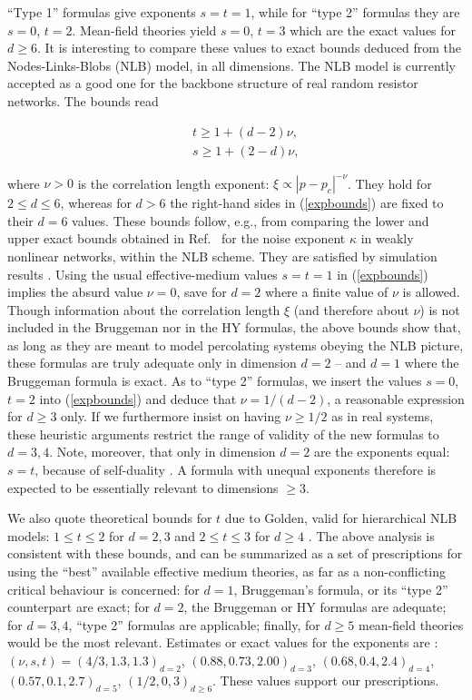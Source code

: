 ``Type 1'' formulas give exponents $s=t=1$, while for ``type 2''
formulas they are $s=0$, $t=2$. Mean-field theories yield $s=0$, $t=3$
which are the exact values for $d\geq 6$.  It is interesting to
compare these values to exact bounds deduced from the
Nodes-Links-Blobs (NLB) model, in all dimensions. The NLB model is
currently accepted as a good one for the backbone structure of real
random resistor networks\cite{STAU92}. The bounds read
\begin{mathletters}
\label{expbounds}
\begin{eqnarray}
&&t\ge 1+(d-2)\nu,\\
&&s\ge 1+(2-d)\nu,
\end{eqnarray}
\end{mathletters}
where $\nu>0$ is the correlation length exponent: $\xi\propto
|p-p_c|^{-\nu}$. They hold for $2\leq d\leq 6$, whereas for $d>6$ the
right-hand sides in (\ref{expbounds}) are fixed to their $d=6$
values. These bounds follow, e.g., from comparing the lower and upper
exact bounds obtained in Ref.\ \cite{WRIG86} for the noise exponent
$\kappa$ in weakly nonlinear networks, within the NLB scheme. They
are satisfied by simulation results \cite{WRIG86}. 
Using the usual
effective-medium values $s=t=1$ in (\ref{expbounds}) implies the
absurd value $\nu=0$, save for $d=2$ where a finite value of $\nu$ is
allowed. Though information about the correlation length $\xi$ (and
therefore about $\nu$) is not included in the Bruggeman nor in the HY
formulas, the above bounds show that, as long as they are meant to
model percolating systems obeying the NLB picture, these formulas are
truly adequate only in dimension $d=2$ -- and $d=1$ where the Bruggeman
formula is exact. As to ``type 2'' formulas, we insert the
values $s=0$, $t=2$ into (\ref{expbounds}) and deduce that
$\nu=1/(d-2)$, a reasonable expression for $d\geq 3$ only. If we
furthermore insist on having $\nu\geq 1/2$ as in real systems, these
heuristic arguments restrict the range of validity of the new formulas
to $d=3,4$. Note, moreover, that only in dimension $d=2$ are the
exponents equal: $s=t$, because of self-duality \cite{STRA77}.  A
formula with unequal exponents therefore is expected to be essentially
relevant to dimensions $\geq 3$.

We also quote theoretical bounds for $t$ due to Golden, valid for
hierarchical NLB models: $1\leq t\leq 2$ for $d=2,3$ and $2\leq t\leq
3$ for $d\geq 4$ \cite{GOLD90}. The above analysis is consistent with
these bounds, and can be summarized as a set of prescriptions for
using the ``best'' available effective medium theories, as far as a
non-conflicting critical behaviour is concerned: for $d=1$,
Bruggeman's formula, or its ``type 2'' counterpart are exact; for
$d=2$, the Bruggeman or HY formulas are adequate; for $d=3,4$, ``type
2'' formulas are applicable; finally, for $d\geq 5$ mean-field
theories would be the most relevant.  Estimates or exact values for
the exponents are \cite{STAU92}: $(\nu,s,t)=(4/3,1.3,1.3)_{d=2}$,
$(0.88,0.73,2.00)_{d=3}$, $(0.68,0.4,2.4)_{d=4}$,
$(0.57,0.1,2.7)_{d=5}$, $(1/2,0,3)_{d\geq 6}$. These values support
our prescriptions.

